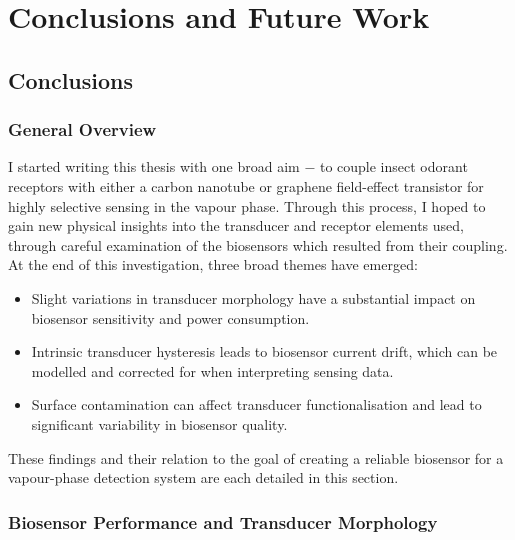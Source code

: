 \documentclass[
  letterpaper,
  DIV=11,
  numbers=noendperiod]{scrartcl}
\author{}
\date{}
\begin{document}
\ifdefined\Shaded\renewenvironment{Shaded}{\begin{tcolorbox}[interior hidden, borderline west={3pt}{0pt}{shadecolor}, boxrule=0pt, sharp corners, enhanced, breakable, frame hidden]}{\end{tcolorbox}}\fi

\hypertarget{conclusions-and-future-work}{%
\section{Conclusions and Future
Work}\label{conclusions-and-future-work}}

\hypertarget{sec-conclusions}{%
\subsection{Conclusions}\label{sec-conclusions}}

\hypertarget{general-overview}{%
\subsubsection{General Overview}\label{general-overview}}

I started writing this thesis with one broad aim \(-\) to couple insect
odorant receptors with either a carbon nanotube or graphene field-effect
transistor for highly selective sensing in the vapour phase. Through
this process, I hoped to gain new physical insights into the transducer
and receptor elements used, through careful examination of the
biosensors which resulted from their coupling. At the end of this
investigation, three broad themes have emerged:

\begin{itemize}
\item
  Slight variations in transducer morphology have a substantial impact
  on biosensor sensitivity and power consumption.
\item
  Intrinsic transducer hysteresis leads to biosensor current drift,
  which can be modelled and corrected for when interpreting sensing
  data.
\item
  Surface contamination can affect transducer functionalisation and lead
  to significant variability in biosensor quality.
\end{itemize}

These findings and their relation to the goal of creating a reliable
biosensor for a vapour-phase detection system are each detailed in this
section.

\hypertarget{biosensor-performance-and-transducer-morphology}{%
\subsubsection{Biosensor Performance and Transducer
Morphology}\label{biosensor-performance-and-transducer-morphology}}
\end{document}
